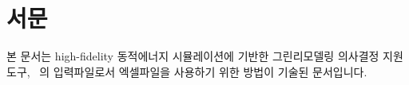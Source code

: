 \documentclass[oneside,openany,a4paper,12pt]{book}
\begin{document}
\pagestyle{plain} 



\section*{서문}
본 문서는 high-fidelity 동적에너지 시뮬레이션에 기반한 그린리모델링 의사결정 지원 도구, \simulator~\releaseversion 의 입력파일로서 엑셀파일을 사용하기 위한 방법이 기술된 문서입니다.


\tableofcontents       
\listoffigures          
\listoftables          


\clearpage      
{}

\mainmatter




\backmatter



\end{document}
